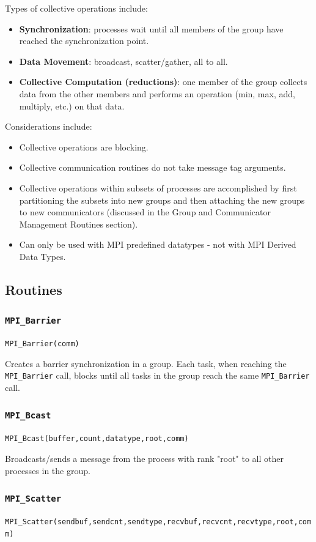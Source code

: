 Types of collective operations include:
\begin{itemize}
\item \textbf{Synchronization}: processes wait until all members of the group have reached the synchronization point.
\item \textbf{Data Movement}: broadcast, scatter/gather, all to all. 
\item \textbf{Collective Computation (reductions)}: one member of the group collects data from the other members and performs an operation (min, max, add, multiply, etc.) on that data.  
\end{itemize}

Considerations include:
\begin{itemize}
\item Collective operations are blocking.  
\item Collective communication routines do not take message tag arguments.  
\item Collective operations within subsets of processes are accomplished by first partitioning the subsets into new groups and then attaching the new groups to new communicators (discussed in the Group and Communicator Management Routines section).  
\item Can only be used with MPI predefined datatypes - not with MPI Derived Data Types.  
\end{itemize}

\subsection{Routines}
\subsubsection{\texttt{MPI\_Barrier}}
\texttt{MPI\_Barrier(comm)  }

Creates a barrier synchronization in a group. Each task, when reaching the \texttt{MPI\_Barrier} call, blocks until all tasks in the group reach the same \texttt{MPI\_Barrier} call.  

\subsubsection{\texttt{MPI\_Bcast}}
\texttt{MPI\_Bcast(buffer,count,datatype,root,comm)}

Broadcasts/sends a message from the process with rank "root" to all other processes in the group.  

\subsubsection{\texttt{MPI\_Scatter}}
\texttt{MPI\_Scatter(sendbuf,sendcnt,sendtype,recvbuf,recvcnt,recvtype,root,comm)}

